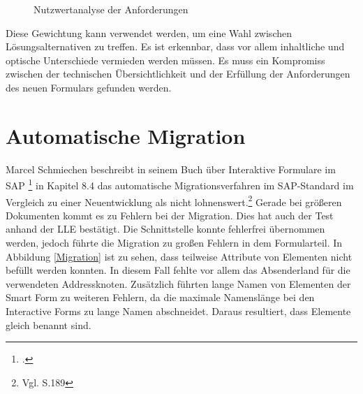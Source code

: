 \begin{figure}[ht]
	\centering
	\caption{Nutzwertanalyse der Anforderungen}
	\label{figNutz}
\end{figure}

Diese Gewichtung kann verwendet werden, um eine Wahl zwischen Lösungsalternativen zu treffen. Es ist erkennbar, dass vor allem inhaltliche und optische Unterschiede vermieden werden müssen. Es muss ein Kompromiss zwischen der technischen Übersichtlichkeit und der Erfüllung der Anforderungen des neuen Formulars gefunden werden.


\section{Automatische Migration}
\label{ch:Migration}

Marcel Schmiechen beschreibt in seinem Buch über Interaktive Formulare im SAP \footcite{Schmiechen.2016} in Kapitel 8.4 das automatische Migrationsverfahren im SAP-Standard im Vergleich zu einer Neuentwicklung als nicht lohnenswert.\footnote{Vgl. \cite{Schmiechen.2016} S.189} Gerade bei größeren Dokumenten kommt es zu Fehlern bei der Migration. Dies hat auch der Test anhand der \ac{LLE} bestätigt. Die Schnittstelle konnte fehlerfrei übernommen werden, jedoch führte die Migration zu großen Fehlern in dem Formularteil. In Abbildung \ref{Migration} ist zu sehen, dass teilweise Attribute von Elementen nicht befüllt werden konnten. In diesem Fall fehlte vor allem das Absenderland für die verwendeten Addressknoten. Zusätzlich führten lange Namen von Elementen der Smart Form zu weiteren Fehlern, da die maximale Namenslänge bei den Interactive Forms zu lange Namen abschneidet. Daraus resultiert, dass Elemente gleich benannt sind.

